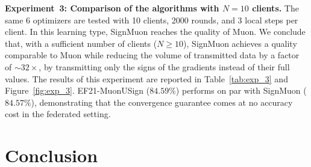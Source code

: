 \documentclass[letterpaper]{article} %
\begin{document}
\textbf{Experiment~3: Comparison of the algorithms with $N=10$ clients.} 
The same 6 optimizers are tested with 10 clients, 2000 rounds, and 3 local steps per client. In this learning type, SignMuon reaches the quality of Muon. We conclude that, with a sufficient number of clients ($N \ge 10$), SignMuon achieves a quality comparable to Muon while reducing the volume of transmitted data by a factor of ${\sim}32\times$, by transmitting only the signs of the gradients instead of their full values. The results of this experiment are reported in Table~\ref{tab:exp_3} and Figure~\ref{fig:exp_3}. EF21-MuonUSign ($84.59\%$) performs on par with SignMuon ($84.57\%$), demonstrating that the convergence guarantee comes at no accuracy cost in the federated setting.




\section{Conclusion}\label{sec:conclusion}
\end{document}
